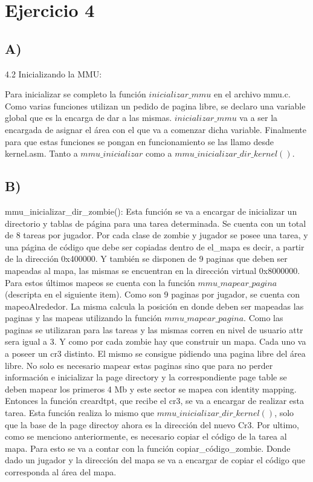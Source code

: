 \section{Ejercicio 4}



\subsection*{A)}

4.2 Inicializando la MMU:\newline

Para inicializar se completo la funci\'on $inicializar\_mmu$ en el archivo mmu.c. Como varias funciones utilizan un pedido de pagina libre, se declaro una variable global que es la encarga de dar a las mismas. $inicializar\_mmu$ va a ser la encargada de asignar el \'area con el que va a comenzar dicha variable. Finalmente para que estas funciones se pongan 
en funcionamiento se las llamo desde kernel.asm. Tanto a $mmu\_inicializar$ como a $mmu\_inicializar\_dir\_kernel()$.

\subsection*{B)}

mmu\_inicializar\_dir\_zombie():\newline \newline
Esta funci\'on  se va a encargar de inicializar un directorio y tablas de p\'agina para una tarea determinada.  Se cuenta con un total de 8 tareas por jugador. Por cada clase de 
zombie y jugador se posee una tarea, y una p\'agina de c\'odigo que  debe ser copiadas dentro de el\_mapa es decir, a partir de la direcci\'on  0x400000. Y tambi\'en se disponen 
de 9 paginas que deben ser mapeadas al mapa, las mismas se encuentran en la direcci\'on virtual 0x8000000. \newline
Para estos \'ultimos mapeos se cuenta con la funci\'on $mmu\_mapear\_pagina$ (descripta en el siguiente item). Como son 9 paginas por jugador, se cuenta con mapeoAlrededor. La misma calcula la posici\'on en donde deben ser mapeadas las paginas y las mapeas utilizando la funci\'on 
$mmu\_mapear\_pagina$. Como las paginas se utilizaran para las tareas y las mismas corren en nivel de usuario attr sera igual a 3. Y como por cada zombie hay que construir un mapa. 
Cada uno va a poseer un cr3 distinto. El mismo se consigue pidiendo una pagina libre del \'area libre.  No solo es necesario mapear estas paginas sino que para no perder 
informaci\'on e inicializar la page directory y la correspondiente page table se deben mapear los primeros 4 Mb y este sector se mapea con identity mapping. Entonces la funci\'on 
creardtpt, que recibe el cr3, se va a encargar de realizar esta tarea. Esta funci\'on realiza lo mismo que  $mmu\_inicializar\_dir\_kernel()$, solo que la base de la page directoy 
ahora es la direcci\'on del nuevo Cr3. Por ultimo, como se menciono anteriormente, es necesario copiar el c\'odigo de la tarea al mapa. Para esto se va a contar con la funci\'on 
copiar\_c\'odigo\_zombie. Donde dado un jugador y la direcci\'on del mapa se va a encargar de copiar el c\'odigo que corresponda al \'area del mapa.\newline

